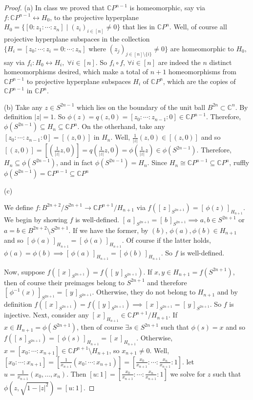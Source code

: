 \documentclass[addpoints,10pt]{exam}
\theoremstyle{plain}
\theoremstyle{definition}
\theoremstyle{plain}
\theoremstyle{plain}
\theoremstyle{definition}
\newcommand{\class}[2][]{\ensuremath{\left[\,#2\,\right]_{#1}}}
\newcommand{\CC}{\ensuremath{\mathbb{C}}}
\begin{document}
\begin{proof}
  (a) In class we proved that $\CC P^{n-1}$ is homeomorphic, say via $f:\CC P^{n-1}\longleftrightarrow H_{0}$, to the projective hyperplane $H_{0}=\{[0:z_{1}:\cdots :z_{n}]\mid (z_{i})_{i\in [n]}\neq 0\}$ that lies in $\CC P^{n}$. Well, of course all projective hyperplane subspaces in the collection $\{H_{i}=[z_{0}:\cdots :z_{i}=0:\cdots :z_{n}]\text{ where } (z_{j})_{j\in [n]\setminus\{i\}}\neq 0\}$ are homeomorphic to $H_{0},$ say via $f_{i}:H_{0}\longleftrightarrow H_{i},\;\forall i\in [n].$ So $f_{i}\circ f$, $\forall i\in [n]$ are indeed the $n$ distinct homeomorphisms desired, which make a total of $n+1$ homeomorphisms from $\CC P^{n-1}$ to projective hyperplane subspaces $H_{i}$ of $\CC P^{n}$, which are the copies of $\CC P^{n-1}$ in $\CC P^{n}$. 

  (b) Take any $z\in S^{2n-1}$ which lies on the boundary of the unit ball $B^{2n}\subset \CC^{n}$. By definition $|z|=1$. So $\phi(z)=q(z,0)=[z_{0}:\cdots :z_{n-1}:0]\in \CC P^{n-1}.$ Therefore, $\phi(S^{2n-1})\subseteq H_{n}\subseteq \CC P^{n}.$ On the otherhand, take any $[z_{0}:\cdots :z_{n-1}:0]=[(z,0)]$ in $H_{n}$. Well, $\frac{1}{|z|}(z,0)\in [(z,0)]$ and so $[(z,0)]=[(\frac{1}{|z|}z,0)]=q(\frac{1}{|z|}z,0)=\phi(\frac{1}{|z|}z)\in \phi(S^{2n-1}).$ Therefore, $H_{n}\subseteq \phi(S^{2n-1})$, and in fact $\phi(S^{2n-1})=H_{n}.$ Since $H_{n}\cong \CC P^{n-1}\subseteq \CC P^{n}$, ruffly $\phi(S^{2n-1})=\CC P^{n-1}\subseteq \CC P^{n}$

  (c)

  We define $f: B^{2n+2}/S^{2n+1} \to \CC P^{n+1}/H_{n+1}$ via $f(\class[S^{2n+1}]{z})=\class[H_{n+1}]{\phi(z)}$. We begin by showing $f$ is well-defined. $\class[S^{2n+1}]{a}=\class[S^{2n+1}]{b}\implies a,b\in S^{2n+1}$ or $a=b\in B^{2n+2}\setminus {S^{2n+1}}.$ If we have the former, by $(b)$, $\phi(a),\phi(b)\in H_{n+1}$ and so $\class[H_{n+1}]{\phi(a)}=\class[H_{n+1}]{\phi(a)}.$ Of course if the latter holds, $\phi(a)=\phi(b)\implies \class[H_{n+1}]{\phi(a)}=\class[H_{n+1}]{\phi(b)}.$ So $f$ is well-defined.

  Now, suppose $f(\class[S^{2n+1}]{x})=f(\class[S^{2n+1}]{y})$. If $x,y\in H_{n+1}=f(S^{2n+1})$, then of course their preimages belong to $S^{2n+1}$ and therefore $\class[S^{2n+1}]{\phi^{-1}(x)}=\class[S^{2n+1}]{y}.$ Otherwise, they do not belong to $H_{n+1}$ and by definition $f(\class[S^{2n+1}]{x})=f(\class[S^{2n+1}]{y})\implies \class[S^{2n+1}]{x}=\class[S^{2n+1}]{y}.$ So $f$ is injective. Next, consider any $\class[H_{n+1}]{x}\in \CC P^{n+1}/H_{n+1}.$ If $x\in H_{n+1}=\phi(S^{2n+1})$, then of course $\exists s\in S^{2n+1}$ such that $\phi(s)=x$ and so $f(\class[S^{2n+1}]{s})=\class[H_{n+1}]{\phi(s)}=\class[H_{n+1}]{x}.$ Otherwise, $x=[x_{0}:\cdots:x_{n+1}]\in \CC P^{n+1}\setminus H_{n+1}$, so $x_{n+1}\neq 0$. Well, $[x_{0}:\cdots:x_{n+1}]=[\frac{1}{x_{n+1}}(x_{0}:\cdots:x_{n+1})]=[\frac{x_{0}}{x_{n+1}}:\cdots:\frac{x_{n}}{x_{n+1}}:1].$ let $u=\frac{1}{x_{n+1}}(x_{0},\hdots,x_{n}).$ Then $[u:1]=[\frac{x_{0}}{x_{n+1}}:\cdots:\frac{x_{n}}{x_{n+1}}:1]$ we solve for $z$ such that $\phi(z,\sqrt{1-|z|^{2}})=[u:1]$. 
  

\end{proof}
\end{document}
